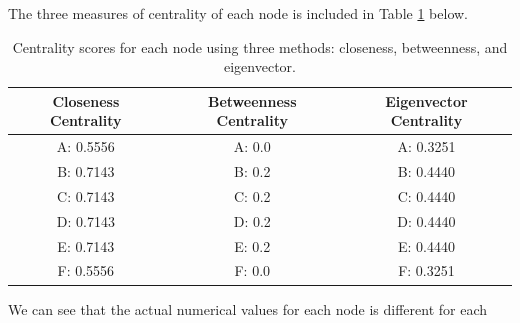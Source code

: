 \documentclass[]{exam}
\numberwithin{equation}{section}
\begin{document}
\begin{questions}
\begin{parts}
The three measures of centrality of each node is included in Table \ref{centrality} below.  

\begin{table}[h!]
\caption{Centrality scores for each node using three methods: closeness, betweenness, and eigenvector.}
\begin{center}
\begin{tabular}{ccc}
Closeness Centrality & Betweenness Centrality & Eigenvector Centrality \\\hline
A: 0.5556 & A: 0.0 & A: 0.3251 \\
B: 0.7143 & B: 0.2 & B: 0.4440 \\
C: 0.7143 & C: 0.2 & C: 0.4440\\
D: 0.7143 & D: 0.2 & D: 0.4440 \\
E: 0.7143 & E: 0.2 & E: 0.4440\\
F: 0.5556 & F: 0.0 & F: 0.3251 \\
\end{tabular}
\end{center}
\label{centrality}
\end{table}

We can see that the actual numerical values for each node is different for each 



\end{parts}

\end{questions}
\end{document}
